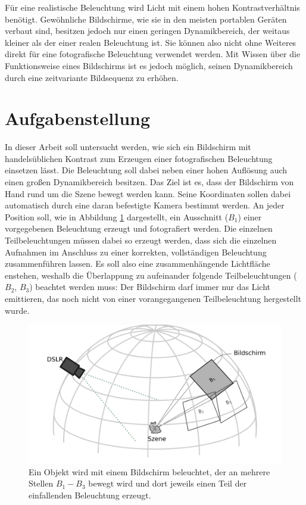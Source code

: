   Für eine realistische Beleuchtung wird Licht mit einem hohen Kontrastverhältnis benötigt.
  Gewöhnliche Bildschirme, wie sie in den meisten portablen Geräten verbaut sind, besitzen jedoch nur einen geringen Dynamikbereich, der weitaus kleiner als der einer realen Beleuchtung ist.
  Sie können also nicht ohne Weiteres direkt für eine fotografische Beleuchtung verwendet werden.
  Mit Wissen über die Funktionsweise eines Bildschirms ist es jedoch möglich, seinen Dynamikbereich durch eine zeitvariante Bildsequenz zu erhöhen.



   
\section{Aufgabenstellung}  \label{aufgabenstellung}
  In dieser Arbeit soll untersucht werden, wie sich ein Bildschirm mit handelsüblichen Kontrast zum Erzeugen einer fotografischen Beleuchtung einsetzen lässt.
  Die Beleuchtung soll dabei neben einer hohen Auflösung auch einen großen Dynamikbereich besitzen.
  Das Ziel ist es, dass der Bildschirm von Hand rund um die Szene bewegt werden kann. Seine Koordinaten sollen dabei automatisch durch eine daran befestigte Kamera bestimmt werden.
  An jeder Position soll, wie in Abbildung \ref{fig:beleuchtung} dargestellt, ein Ausschnitt ($B_1$) einer vorgegebenen Beleuchtung erzeugt und fotografiert werden. 
 Die einzelnen Teilbeleuchtungen müssen dabei so erzeugt werden, dass sich die einzelnen Aufnahmen im Anschluss zu einer korrekten, vollständigen Beleuchtung zusammenführen lassen.
  Es soll also eine zusammenhängende Lichtfläche enstehen, weshalb die Überlappung zu aufeinander folgende Teilbeleuchtungen ($B_2$, $B_3$) beachtet werden muss: Der Bildschirm darf immer nur das Licht emittieren, das noch nicht von einer vorangegangenen Teilbeleuchtung hergestellt wurde.

  \begin{figure}[H]
    \centering
    \includegraphics[width=0.8\linewidth]{../graphics/einleitung/beleuchtung.svg}
    \caption[Eine reale Szene mit einen Bildschirm beleuchten]{Ein Objekt wird mit einem Bildschirm beleuchtet, der an mehrere Stellen $B_1-B_3$ bewegt wird und dort jeweils einen Teil der einfallenden Beleuchtung erzeugt. }
    \label{fig:beleuchtung}
   \end{figure}


